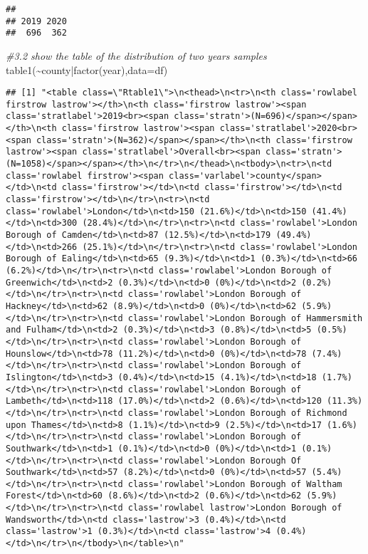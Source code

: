 \documentclass[
]{book}
\newenvironment{Shaded}{\begin{snugshade}}{\end{snugshade}}
\newcommand{\AttributeTok}[1]{\textcolor[rgb]{0.77,0.63,0.00}{#1}}
\newcommand{\CommentTok}[1]{\textcolor[rgb]{0.56,0.35,0.01}{\textit{#1}}}
\newcommand{\FunctionTok}[1]{\textcolor[rgb]{0.00,0.00,0.00}{#1}}
\newcommand{\NormalTok}[1]{#1}
\newcommand{\SpecialCharTok}[1]{\textcolor[rgb]{0.00,0.00,0.00}{#1}}
\begin{document}
\begin{verbatim}
## 
## 2019 2020 
##  696  362
\end{verbatim}

\begin{Shaded}
\begin{Highlighting}[]
\CommentTok{\#3.2 show the table of the distribution of two years samples}
\FunctionTok{table1}\NormalTok{(}\SpecialCharTok{\textasciitilde{}}\NormalTok{county}\SpecialCharTok{|}\FunctionTok{factor}\NormalTok{(year),}\AttributeTok{data=}\NormalTok{df)}
\end{Highlighting}
\end{Shaded}

\begin{verbatim}
## [1] "<table class=\"Rtable1\">\n<thead>\n<tr>\n<th class='rowlabel firstrow lastrow'></th>\n<th class='firstrow lastrow'><span class='stratlabel'>2019<br><span class='stratn'>(N=696)</span></span></th>\n<th class='firstrow lastrow'><span class='stratlabel'>2020<br><span class='stratn'>(N=362)</span></span></th>\n<th class='firstrow lastrow'><span class='stratlabel'>Overall<br><span class='stratn'>(N=1058)</span></span></th>\n</tr>\n</thead>\n<tbody>\n<tr>\n<td class='rowlabel firstrow'><span class='varlabel'>county</span></td>\n<td class='firstrow'></td>\n<td class='firstrow'></td>\n<td class='firstrow'></td>\n</tr>\n<tr>\n<td class='rowlabel'>London</td>\n<td>150 (21.6%)</td>\n<td>150 (41.4%)</td>\n<td>300 (28.4%)</td>\n</tr>\n<tr>\n<td class='rowlabel'>London Borough of Camden</td>\n<td>87 (12.5%)</td>\n<td>179 (49.4%)</td>\n<td>266 (25.1%)</td>\n</tr>\n<tr>\n<td class='rowlabel'>London Borough of Ealing</td>\n<td>65 (9.3%)</td>\n<td>1 (0.3%)</td>\n<td>66 (6.2%)</td>\n</tr>\n<tr>\n<td class='rowlabel'>London Borough of Greenwich</td>\n<td>2 (0.3%)</td>\n<td>0 (0%)</td>\n<td>2 (0.2%)</td>\n</tr>\n<tr>\n<td class='rowlabel'>London Borough of Hackney</td>\n<td>62 (8.9%)</td>\n<td>0 (0%)</td>\n<td>62 (5.9%)</td>\n</tr>\n<tr>\n<td class='rowlabel'>London Borough of Hammersmith and Fulham</td>\n<td>2 (0.3%)</td>\n<td>3 (0.8%)</td>\n<td>5 (0.5%)</td>\n</tr>\n<tr>\n<td class='rowlabel'>London Borough of Hounslow</td>\n<td>78 (11.2%)</td>\n<td>0 (0%)</td>\n<td>78 (7.4%)</td>\n</tr>\n<tr>\n<td class='rowlabel'>London Borough of Islington</td>\n<td>3 (0.4%)</td>\n<td>15 (4.1%)</td>\n<td>18 (1.7%)</td>\n</tr>\n<tr>\n<td class='rowlabel'>London Borough of Lambeth</td>\n<td>118 (17.0%)</td>\n<td>2 (0.6%)</td>\n<td>120 (11.3%)</td>\n</tr>\n<tr>\n<td class='rowlabel'>London Borough of Richmond upon Thames</td>\n<td>8 (1.1%)</td>\n<td>9 (2.5%)</td>\n<td>17 (1.6%)</td>\n</tr>\n<tr>\n<td class='rowlabel'>London Borough of Southwark</td>\n<td>1 (0.1%)</td>\n<td>0 (0%)</td>\n<td>1 (0.1%)</td>\n</tr>\n<tr>\n<td class='rowlabel'>London Borough Of Southwark</td>\n<td>57 (8.2%)</td>\n<td>0 (0%)</td>\n<td>57 (5.4%)</td>\n</tr>\n<tr>\n<td class='rowlabel'>London Borough of Waltham Forest</td>\n<td>60 (8.6%)</td>\n<td>2 (0.6%)</td>\n<td>62 (5.9%)</td>\n</tr>\n<tr>\n<td class='rowlabel lastrow'>London Borough of Wandsworth</td>\n<td class='lastrow'>3 (0.4%)</td>\n<td class='lastrow'>1 (0.3%)</td>\n<td class='lastrow'>4 (0.4%)</td>\n</tr>\n</tbody>\n</table>\n"
\end{verbatim}
\end{document}

